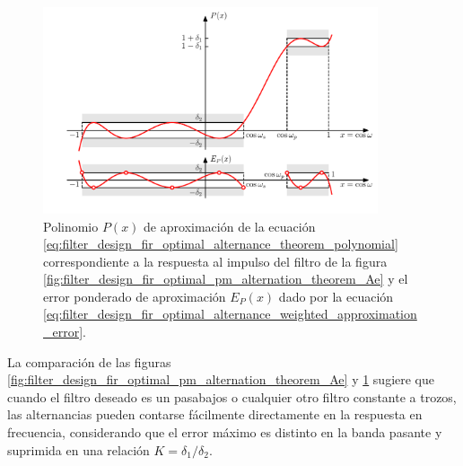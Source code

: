 \documentclass[a4paper]{report}
\begin{document}
\begin{figure}[!htb]
 \begin{center}
 \includegraphics[width=0.88\textwidth]{figuras/filter_design_fir_optimal_pm_alternation_theorem_Px.pdf}
 \caption{\label{fig:filter_design_fir_optimal_pm_alternation_theorem_Px} Polinomio \(P(x)\) de aproximación de la ecuación \ref{eq:filter_design_fir_optimal_alternance_theorem_polynomial} correspondiente a la respuesta al impulso del filtro de la figura \ref{fig:filter_design_fir_optimal_pm_alternation_theorem_Ae} y el error ponderado de aproximación \(E_P(x)\) dado por la ecuación \ref{eq:filter_design_fir_optimal_alternance_weighted_approximation_error}.}
 \end{center}
\end{figure}

La comparación de las figuras \ref{fig:filter_design_fir_optimal_pm_alternation_theorem_Ae} y \ref{fig:filter_design_fir_optimal_pm_alternation_theorem_Px} sugiere que cuando el filtro deseado es un pasabajos o cualquier otro filtro constante a trozos, las alternancias pueden contarse fácilmente directamente en la respuesta en frecuencia, considerando que el error máximo es distinto en la banda pasante y suprimida en una relación \(K=\delta_1/\delta_2\).
\end{document}
